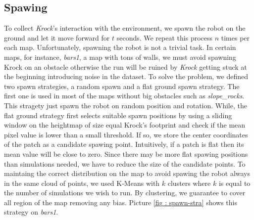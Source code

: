 \documentclass[../document.tex]{subfiles}
\begin{document}
\subsection{Spawing}
To collect \emph{Krock}'s interaction with the environment, we spawn the robot on the ground and let it move forward for $t$ seconds. We repeat this process $n$ times per each map.
    Unfortunately, spawning the robot is not a trivial task. In certain maps, for instance, \emph{bars1}, a map with tons of walls, we must avoid spawning Krock on an obstacle otherwise the run will be ruined by \emph{Krock} getting stuck at the beginning introducing noise in the dataset. To solve the problem, we defined two spawn strategies, a random spawn and a flat ground spawn strategy. The first one is used in most of the maps without big obstacles such as \emph{slope\_rocks}. This stragety just spawn the robot on random position and rotation. 
    While, the flat ground strategy first selects suitable spawn positions by using a sliding window on the heightmap of size equal Krock's footprint and check if the mean pixel value is lower than a small threshold. If so, we store the center coordinates of the patch as a candidate spawing point. Intuitively, if a patch is flat then its mean value will be close to zero.
Since there may be more flat spawing positions than simulations needed, we have to reduce the size of the candidate points. To maintaing the correct distribution on the map to avoid spawing the robot always in the same cloud of points, we used K-Means with $k$ clusters where $k$ is equal to the number of simulations we wish to run. By clustering, we guarantee to cover all region of the map removing any bias. Picture \ref{fig : spawn-stra} shows this strategy on \emph{bars1}. 
\end{document}

